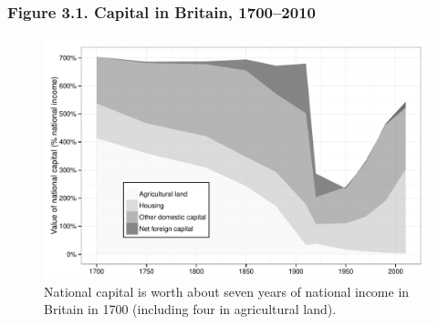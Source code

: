 \documentclass[t]{beamer}\usepackage[]{graphicx}\usepackage[]{color}
\newenvironment{knitrout}{}{} %
\begin{document}
\begin{frame}[label=Figure_3_1]
\frametitle{Figure 3.1. Capital in Britain, 1700--2010}
\begin{figure}[t]
\begin{minipage}[b]{\textwidth}
\centering
\begin{knitrout}\footnotesize
{}\color{fgcolor}

{\centering \includegraphics[width=1\linewidth]{figures/bw/Figure_3_1} 

}



\end{knitrout}
\caption{National capital is worth about seven years of national income in Britain in 1700 (including four in agricultural land).}
\end{minipage}
\end{figure}
\end{frame}
\end{document}
